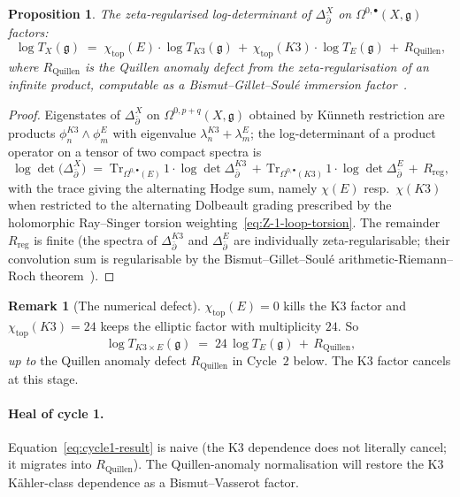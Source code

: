 \documentclass[11pt]{article}
\newtheorem{proposition}[theorem]{Proposition}
\theoremstyle{definition}
\newtheorem{remark}[theorem]{Remark}
\providecommand{\frakg}{\mathfrak{g}}
\renewcommand{\Dbar}{\Delta_{\bar{\partial}}}
\providecommand{\Tr}{\mathrm{Tr}}
\providecommand{\det}{\operatorname{det}}
\providecommand{\reg}{\mathrm{reg}}
\begin{document}
\begin{proposition}
\label{prop:log-det-kunneth}
The zeta-regularised log-determinant of $\Dbar^X$ on
$\Omega^{0,\bullet}(X,\frakg)$ factors:
\begin{equation}
\label{eq:log-det-kunneth}
\log T_X(\frakg) \;=\; \chi_{\mathrm{top}}(E)\cdot \log T_{K3}(\frakg)
\,+\, \chi_{\mathrm{top}}(K3)\cdot \log T_E(\frakg) \,+\, R_{\mathrm{Quillen}},
\end{equation}
where $R_{\mathrm{Quillen}}$ is the Quillen anomaly defect from the
zeta-regularisation of an infinite product, computable as a
Bismut--Gillet--Soul\'e immersion factor~\cite{BGS1988}.
\end{proposition}

\begin{proof}
Eigenstates of $\Dbar^X$ on
$\Omega^{0,p+q}(X,\frakg)$ obtained by K\"unneth restriction are
products $\phi^{K3}_n\wedge\phi^E_m$ with eigenvalue
$\lambda^{K3}_n + \lambda^E_m$; the log-determinant of a product
operator on a tensor of two compact spectra is
\[
\log\det\!\big(\Dbar^X\big)\;=\;
\Tr_{\Omega^{0,\bullet}(E)}\,1\cdot \log\det\Dbar^{K3}
\,+\, \Tr_{\Omega^{0,\bullet}(K3)}\,1\cdot \log\det\Dbar^E
\,+\, R_\reg,
\]
with the trace giving the alternating Hodge sum, namely $\chi(E)$ resp.\
$\chi(K3)$ when restricted to the alternating Dolbeault grading
prescribed by the holomorphic Ray--Singer torsion
weighting~\eqref{eq:Z-1-loop-torsion}. The remainder $R_\reg$ is
finite (the spectra of $\Dbar^{K3}$ and $\Dbar^E$ are individually
zeta-regularisable; their convolution sum is regularisable by the
Bismut--Gillet--Soul\'e arithmetic-Riemann--Roch
theorem~\cite{BGS1988}).
\end{proof}

\begin{remark}[The numerical defect]
\label{rem:numerical-defect}
$\chi_{\mathrm{top}}(E) = 0$ kills the K3 factor and
$\chi_{\mathrm{top}}(K3) = 24$ keeps the elliptic factor with
multiplicity $24$. So
\begin{equation}
\label{eq:cycle1-result}
\log T_{K3\times E}(\frakg) \;=\; 24\,\log T_E(\frakg) \,+\, R_{\mathrm{Quillen}},
\end{equation}
{\em up to} the Quillen anomaly defect $R_{\mathrm{Quillen}}$ in
Cycle~$2$ below. The K3 factor cancels at this stage.
\end{remark}

\paragraph{Heal of cycle 1.} Equation~\eqref{eq:cycle1-result} is naive
(the K3 dependence does not literally cancel; it migrates into
$R_{\mathrm{Quillen}}$). The Quillen-anomaly normalisation will restore
the K3 K\"ahler-class dependence as a Bismut--Vasserot factor.
\end{document}
